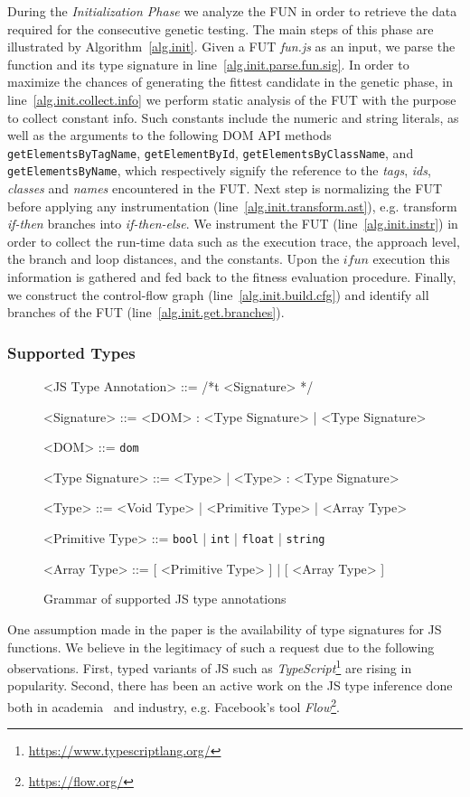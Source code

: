 \documentclass[sigconf,review,anonymous]{acmart}
\begin{document}
During the \emph{Initialization Phase} we analyze the FUN in order to retrieve the data required for the consecutive genetic testing. The main steps of this phase are illustrated by Algorithm~\ref{alg.init}. Given a FUT \emph{fun.js} as an input, we parse the function and its type signature in line~\ref{alg.init.parse.fun.sig}. In order to maximize the chances of generating the fittest candidate in the genetic phase, in line~\ref{alg.init.collect.info} we perform static analysis of the FUT with the purpose to collect constant info. Such constants include the numeric and string literals, as well as the arguments to the following DOM API methods \texttt{getElementsByTagName}, \texttt{getElementById}, \texttt{getElementsByClassName}, and \texttt{getElementsByName},
which respectively signify the reference to the \emph{tags}, \emph{ids}, \emph{classes} and \emph{names} encountered in the FUT. Next step is normalizing the FUT before applying any instrumentation (line~\ref{alg.init.transform.ast}), e.g. transform \emph{if-then} branches into \emph{if-then-else}. We instrument the FUT (line~\ref{alg.init.instr}) in order to collect the run-time data such as the execution trace, the approach level, the branch and loop distances, and the constants. Upon the $ifun$ execution this information is gathered and fed back to the fitness evaluation procedure. Finally, we construct the control-flow graph (line~\ref{alg.init.build.cfg}) and identify all branches of the FUT (line~\ref{alg.init.get.branches}).

\subsubsection{Supported Types}
\label{sub.sec.sup.types}

\begin{figure}[t!]
\setlength{\grammarparsep}{3pt}
\small
\begin{grammar}

<JS Type Annotation> ::= /*t <Signature> */

<Signature> ::= <DOM> : <Type Signature> | <Type Signature>

<DOM> ::= \texttt{dom}

<Type Signature> ::= <Type> | <Type> : <Type Signature>

<Type> ::= <Void Type> | <Primitive Type> | <Array Type>

<Primitive Type> ::= \texttt{bool} | \texttt{int} | \texttt{float} | \texttt{string}

<Array Type> ::= [ <Primitive Type> ] | [ <Array Type> ]
\end{grammar}
\caption{Grammar of supported JS type annotations}
\label{fig.js.type.annot}
\end{figure}
One assumption made in the paper is the availability of type signatures for JS functions. We believe in the legitimacy of such a request due to the following observations. First, typed variants of JS such as \emph{TypeScript}\footnote{\url{https://www.typescriptlang.org/}} are rising in popularity. Second, there has been an active work on the JS type inference done both in academia~\cite{kristensen2017type} and industry, e.g. Facebook's tool \emph{Flow}\footnote{\url{https://flow.org/}}. 
\end{document}
